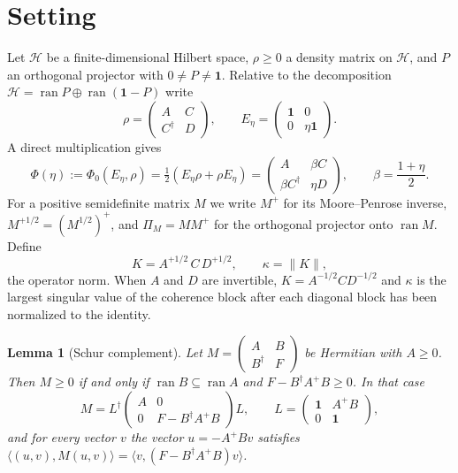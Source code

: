 \documentclass[11pt,a4paper]{article}
\newtheorem{lemma}[theorem]{Lemma}
\theoremstyle{definition}
\theoremstyle{plain}
\DeclareMathOperator{\ran}{ran}
\newcommand{\norm}[1]{\lVert#1\rVert}
\newcommand{\one}{\mathbf{1}}
\begin{document}
\section{Setting}\label{sec:setting}
Let $\mathcal H$ be a finite-dimensional Hilbert space, $\rho\ge0$ a density
matrix on $\mathcal H$, and $P$ an orthogonal projector with $0\ne P\ne\one$.
Relative to the decomposition $\mathcal H=\ran P\oplus\ran(\one-P)$ write
\[
\rho=\begin{pmatrix}A&C\\ C^\dagger&D\end{pmatrix},\qquad
E_\eta=\begin{pmatrix}\one&0\\0&\eta\one\end{pmatrix}.
\]
A direct multiplication gives
\begin{equation}\label{eq:image}
\Phi(\eta):=\Phi_0(E_\eta,\rho)=\tfrac12(E_\eta\rho+\rho E_\eta)
=\begin{pmatrix}A&\beta C\\ \beta C^\dagger&\eta D\end{pmatrix},
\qquad\beta=\frac{1+\eta}{2}.
\end{equation}
For a positive semidefinite matrix $M$ we write $M^+$ for its Moore--Penrose
inverse, $M^{+1/2}=(M^{1/2})^+$, and $\Pi_M=MM^+$ for the orthogonal projector
onto $\ran M$. Define
\[
K=A^{+1/2}\,C\,D^{+1/2},\qquad \kappa=\norm{K},
\]
the operator norm. When $A$ and $D$ are invertible, $K=A^{-1/2}CD^{-1/2}$ and
$\kappa$ is the largest singular value of the coherence block after each
diagonal block has been normalized to the identity.

\begin{lemma}[Schur complement]\label{lem:schur}
Let $M=\left(\begin{smallmatrix}A&B\\B^\dagger&F\end{smallmatrix}\right)$ be
Hermitian with $A\ge0$. Then $M\ge0$ if and only if $\ran B\subseteq\ran A$
and $F-B^\dagger A^+B\ge0$. In that case
\begin{equation}\label{eq:congruence}
M=L^\dagger\begin{pmatrix}A&0\\0&F-B^\dagger A^+B\end{pmatrix}L,\qquad
L=\begin{pmatrix}\one&A^+B\\0&\one\end{pmatrix},
\end{equation}
and for every vector $v$ the vector $u=-A^+Bv$ satisfies
$\langle(u,v),M(u,v)\rangle=\langle v,(F-B^\dagger A^+B)v\rangle$.
\end{lemma}
\end{document}

